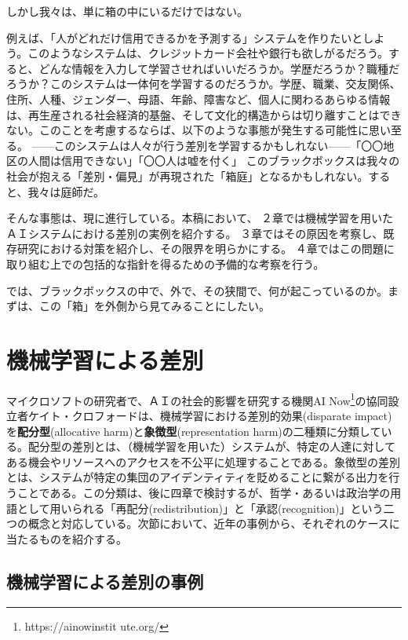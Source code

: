 \documentclass[b5j,twoside,twocolumn]{utarticle}
\begin{document}
しかし我々は、単に箱の中にいるだけではない。


例えば、「人がどれだけ信用できるかを予測する」システムを作りたいとしよう。このようなシステムは、クレジットカード会社や銀行も欲しがるだろう。すると、どんな情報を入力して学習させればいいだろうか。学歴だろうか？職種だろうか？このシステムは一体何を学習するのだろうか。学歴、職業、交友関係、住所、人種、ジェンダー、母語、年齢、障害など、個人に関わるあらゆる情報は、再生産される社会経済的基盤、そして文化的構造からは切り離すことはできない。このことを考慮するならば、以下のような事態が発生する可能性に思い至る。
------このシステムは人々が行う差別を学習するかもしれない------「〇〇地区の人間は信用できない」「〇〇人は嘘を付く」
このブラックボックスは我々の社会が抱える「差別・偏見」が再現された「箱庭」となるかもしれない。すると、我々は庭師だ。


そんな事態は、現に進行している。本稿において、
２章では機械学習を用いたＡＩシステムにおける差別の実例を紹介する。
３章ではその原因を考察し、既存研究における対策を紹介し、その限界を明らかにする。
４章ではこの問題に取り組む上での包括的な指針を得るための予備的な考察を行う。


では、ブラックボックスの中で、外で、その狭間で、何が起こっているのか。まずは、この「箱」を\.外\.側から見てみることにしたい。



\section{機械学習による差別}
マイクロソフトの研究者で、ＡＩの社会的影響を研究する機関AI Now\footnote{https://ainowinstit ute.org/}の協同設立者ケイト・クロフォードは、機械学習における差別的効果(disparate impact)を\textbf{配分型}(allocative  harm)と\textbf{象徴型}(representation harm)の二種類に分類している\cite{kate}。配分型の差別とは、（機械学習を用いた）システムが、特定の人達に対してある機会やリソースへのアクセスを不公平に処理することである。象徴型の差別とは、システムが特定の集団のアイデンティティを貶めることに繋がる出力を行うことである。この分類は、後に四章で検討するが、哲学・あるいは政治学の用語として用いられる「再配分(redistribution)」と「承認(recognition)」という二つの概念と対応している。次節において、近年の事例から、それぞれのケースに当たるものを紹介する。



\subsection{機械学習による差別の事例}
\end{document}
